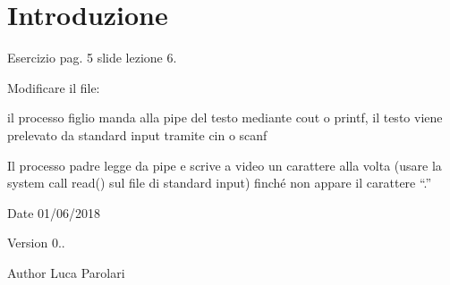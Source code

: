 \hypertarget{index_intro}{}\section{Introduzione}\label{index_intro}
Esercizio pag. 5 slide lezione 6.

Modificare il file\+:
\begin{DoxyItemize}
\item il processo figlio manda alla pipe del testo mediante cout o printf, il testo viene prelevato da standard input tramite cin o scanf
\item Il processo padre legge da pipe e scrive a video un carattere alla volta (usare la system call read() sul file di standard input) finché non appare il carattere “.\+”
\end{DoxyItemize}

\begin{DoxyDate}{Date}
01/06/2018 
\end{DoxyDate}
\begin{DoxyVersion}{Version}
0.. 
\end{DoxyVersion}
\begin{DoxyAuthor}{Author}
Luca Parolari 
\end{DoxyAuthor}
